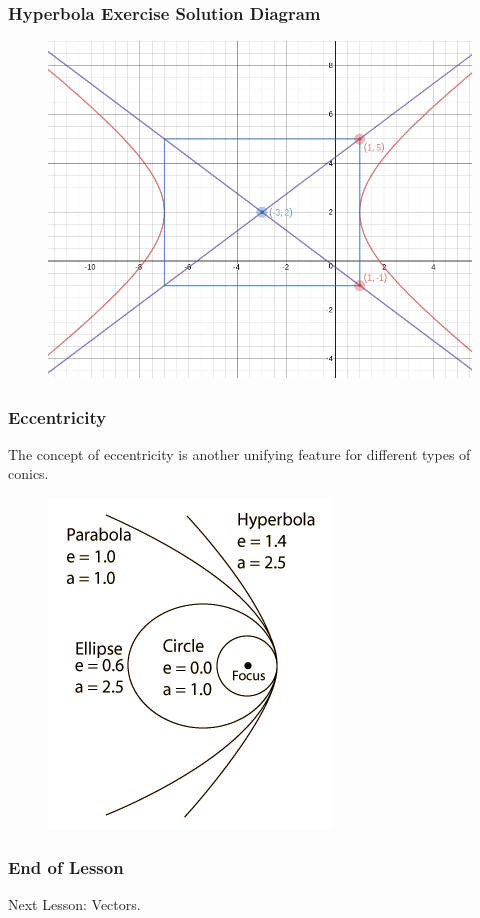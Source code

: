 \documentclass[xcolor=dvipsnames]{beamer}
\begin{document}
\begin{frame}
  \frametitle{Hyperbola Exercise Solution Diagram}
  \begin{figure}[h]
    \includegraphics[scale=.4]{./hyperbola3.png}
  \end{figure}
\end{frame}

\begin{frame}
  \frametitle{Eccentricity}
The concept of eccentricity is another unifying feature for different
types of conics.
  \begin{figure}[h]
    \includegraphics[scale=.65]{./conorb.png}
  \end{figure}
\end{frame}

\begin{frame}
  \frametitle{End of Lesson}
Next Lesson: Vectors.
\end{frame}
\end{document}
